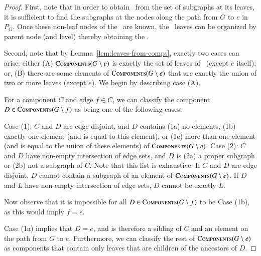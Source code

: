 \begin{proof}
    First, note that in order to obtain \branchGePG\ from the set of subgraphs at its leaves, it is sufficient to find the subgraphs at the nodes along the path from $G$ to $e$ in $P_G$. Once these non-leaf nodes of the \branch\ are known, the \branch\ leaves can be organized by parent node (and level) thereby obtaining the \branch.

    Second, note that by Lemma~\ref{lem:leaves-from-comps}, exactly two cases can arise: either (A) $\textsc{Components}(G\setminus e)$ is exactly the set of leaves of \branchGePG\ (except $e$ itself); or, (B) there are some elements of $\textsc{Components}(G\setminus e)$ that are exactly the union of two or more leaves (except $e$). We begin by describing case (A).

    For a component $C$ and edge $f\in C$, we can classify the component $D\in \textsc{Components}(G\setminus f)$ as being one of the following cases:

    Case (1):
    $C$ and $D$ are edge disjoint, and $D$ contains
    (1a) no elements,
    (1b) exactly one element (and is equal to this element), or
    (1c) more than one element (and is equal to the union of these elements)
    of $\textsc{Components}(G\setminus e)$.
    Case (2):
    $C$ and $D$ have non-empty intersection of edge sets, and $D$ is
    (2a) a proper subgraph or
    (2b) not a subgraph
    of $C$.
    Note that this list is exhaustive. If $C$ and $D$ are edge disjoint, $D$ cannot contain a subgraph of an element of $\textsc{Components}(G\setminus e)$.
    If $D$ and $L$ have non-empty intersection of edge sets, $D$ cannot be exactly $L$.


    Now observe that it is impossible for all $D\in \textsc{Components}(G\setminus f)$ to be Case (1b), as this would imply $f=e$.

    Case (1a) implies that $D=e$, and is therefore a sibling of $C$ and an element on the path from $G$ to $e$. Furthermore, we can classify the rest of $\textsc{Components}(G\setminus e)$ as components that contain only leaves that are children of the ancestors of $D$.


\end{proof}
